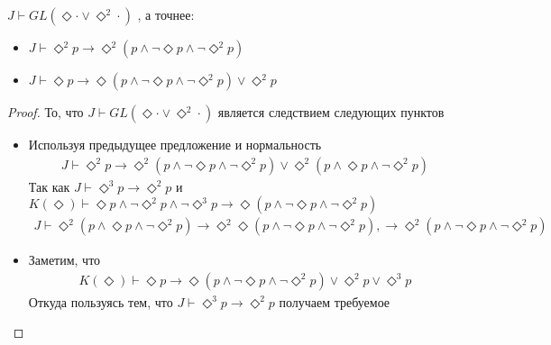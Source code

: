 \documentclass[12pt,a4paper,oneside]{article} \usepackage[left=2cm, right=2cm, top=1.3cm, bottom=2cm]{geometry}
\begin{document}
  \begin{corollary}
    $J \vdash  GL(\Diamond \cdot \vee  \Diamond ^2\cdot)$ , а точнее:
    \begin{itemize}
      \item $J \vdash  \Diamond ^2 p \rightarrow  \Diamond ^2(p \wedge  \neg \Diamond p \wedge  \neg \Diamond ^2 p)$
      \item $J \vdash  \Diamond  p \rightarrow  \Diamond (p \wedge  \neg \Diamond p \wedge  \neg \Diamond ^2 p) \vee  \Diamond ^2 p$
    \end{itemize}
  \end{corollary}
  \begin{proof}
    То, что  $J \vdash  GL(\Diamond \cdot \vee  \Diamond ^2\cdot)$
     является следствием следующих пунктов
    \begin{itemize}
      \item Используя предыдущее предложение и нормальность
            \begin{align*}
              J \vdash  \Diamond ^2 p \rightarrow  \Diamond ^2(p \wedge  \neg \Diamond p \wedge  \neg \Diamond ^2 p) \vee  \Diamond ^2(p \wedge  \Diamond p \wedge  \neg \Diamond ^2 p)
            \end{align*}
            Так как  $J \vdash  \Diamond ^3 p \rightarrow  \Diamond ^2 p$  и 
            $K(\Diamond ) \vdash  \Diamond p \wedge  \neg \Diamond ^2 p \wedge  \neg \Diamond ^3 p \rightarrow  \Diamond (p \wedge  \neg \Diamond p \wedge  \neg \Diamond ^2 p)$
            \begin{align*}
              J \vdash  \Diamond ^2(p \wedge  \Diamond p \wedge  \neg \Diamond ^2 p) \rightarrow  \Diamond ^2\Diamond (p \wedge  \neg \Diamond p \wedge  \neg \Diamond ^2 p), \rightarrow  \Diamond ^2(p \wedge  \neg \Diamond p \wedge  \neg \Diamond ^2 p)
            \end{align*}
      \item Заметим, что
            \begin{align*}
              K(\Diamond ) \vdash  \Diamond p \rightarrow  \Diamond (p \wedge  \neg \Diamond p \wedge  \neg \Diamond ^2 p) \vee  \Diamond ^2 p \vee  \Diamond ^3 p
            \end{align*}
            Откуда пользуясь тем, что  $J \vdash  \Diamond ^3 p \rightarrow  \Diamond ^2 p$
             получаем требуемое
    \end{itemize}
  \end{proof}
\end{document}
